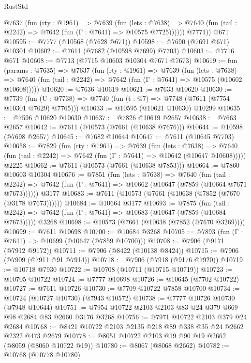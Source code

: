 \begin{lexlean}{RustStd}
\begin{coremodule}
          @7637
            (fun (rty : @1961) =>
            @7639
              (fun (lets : @7638) =>
              @7640 (fun (tail : @2242) => @7642 (fun (Γ : @7641) => @10575 @7725))))))
        @7771))
    @671
@10595 := @7777 (@10568 (@7628 @671))
@10598 := @7690 (@7691 @671) @10301
@10602 := @7611 (@7682 (@10598 @7699) @7703)
@10603 := @7716 @671
@10608 := @7713 (@7715 @10603 @10304 @7671 @7673)
@10619 := fun (params : @7635) =>
  @7637
    (fun (rty : @1961) =>
    @7639
      (fun (lets : @7638) =>
      @7640 (fun (tail : @2242) => @7642 (fun (Γ : @7641) => @10575 (@10602 @10608)))))
@10620 := @7636 @10619
@10621 := @7633 @10620
@10630 := @7739
    (fun (U : @7738) => @7740 (fun (t : @7) => @7748 (@7611 (@7754 @10301 @7629) @7765)))
@10633 := @10595 (@10621 @10630) @10299
@10635 := @7596 @10620 @10630
@10637 := @7826 @10619 @2657
@10638 := @7663 @2657
@10642 := @7611 (@10573 (@7661 (@10638 @7676)))
@10644 := @10598 (@7698 @2657)
@10645 := @7682 @10644
@10647 := @7611 (@10645 @7703)
@10658 := @7829
    (fun (rty : @1961) =>
    @7639
      (fun (lets : @7638) =>
      @7640 (fun (tail : @2242) => @7642 (fun (Γ : @7641) => @10642 (@10647 @10608)))))
    @2225
@10662 := @7611 (@10573 (@7661 (@10638 @7853)))
@10664 := @7860 @10603 @10304
@10676 := @7851
    (fun (lets : @7638) =>
    @7640
      (fun (tail : @2242) =>
      @7642 (fun (Γ : @7641) => @10662 (@10647 (@7859 (@10664 @7671 @7673))))))
    @3177
@10683 := @7611 (@10573 (@7661 (@10638 (@7852 (@7670 (@3178 @7673))))))
@10684 := @10664 @3177
@10693 := @7875
    (fun (tail : @2242) => @7642 (fun (Γ : @7641) => @10683 (@10647 (@7859 (@10684 @7673)))))
    @3268
@10698 := @10573 (@7661 (@10638 (@7852 (@7670 @3269))))
@10699 := @7611 @10698
@10700 := @10684 @3268
@10705 := @7893 (fun (Γ : @7641) => @10699 (@10647 (@7859 @10700)))
@10708 := @7906 (@9171 (@7912 @9172))
@10711 := @7906 (@8422 (@10138 @8424))
@10715 := @7906 (@7909 (@7911 @91 @7914))
@10718 := @7906 (@7918 (@9176 @7920))
@10719 := @10718 @7930
@10722 := @10708 (@10711 (@10715 @10719))
@10723 := @10705 @10722
@10724 := @7777 @10698
@10726 := @10645 (@7702 @10722)
@10727 := @7611 @10726
@10730 := @7709 @10722 @7858 @10700
@10734 := @10724 (@10727 @10730) (@7943 @10572)
@10738 := @7777 @10726 @10730 (@7948 @10644)
@10751 := @7954 @10722 @2103 @2103 @83 @24 @379 @669 @98 @2684 @83 @2660 @3176 @3268
@10756 := @7971 @10722 @2103 @379 @24 @2684
@10768 := @8421 @10722 @2103 @2135 @218 @89 @338 @35 @24 @2662 @2322 @473 @2679
@10778 := @8051 @10722 @2103 @19 @90 @19 @2662 (@8059 (@8060 @10722 @19))
@10780 := @8067 (@8068 @2662)
@10782 := @10768 (@10778 @10780)

\end{coremodule}
\end{lexlean}
